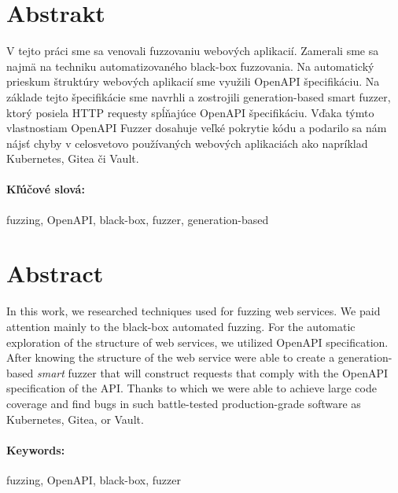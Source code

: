 \documentclass[12pt, twoside]{book}
\begin{document}
\section*{Abstrakt}

V tejto práci sme sa venovali fuzzovaniu webových aplikacií. Zamerali sme sa najmä na techniku automatizovaného black-box fuzzovania. Na automatický prieskum štruktúry webových aplikacií sme využili OpenAPI špecifikáciu. Na základe tejto špecifikácie sme navrhli a zostrojili generation-based smart fuzzer, ktorý posiela HTTP requesty spĺňajúce OpenAPI špecifikáciu. Vďaka týmto vlastnostiam OpenAPI Fuzzer dosahuje veľké pokrytie kódu a podarilo sa nám nájsť chyby v celosvetovo používaných webových aplikaciách ako napríklad Kubernetes, Gitea či Vault.


\paragraph*{Kľúčové slová:} fuzzing, OpenAPI, black-box, fuzzer, generation-based


\newpage
\section*{Abstract}
In this work, we researched techniques used for fuzzing web services. We paid attention mainly to the black-box automated fuzzing. For the automatic exploration of the structure of web services, we utilized OpenAPI specification. After knowing the structure of the web service were able to create a generation-based \textit{smart} fuzzer that will construct requests that comply with the OpenAPI specification of the API. Thanks to which we were able to achieve large code coverage and find bugs in such battle-tested production-grade software as Kubernetes, Gitea, or Vault.

\paragraph*{Keywords:} fuzzing, OpenAPI, black-box, fuzzer




\newpage

\tableofcontents

\end{document}
